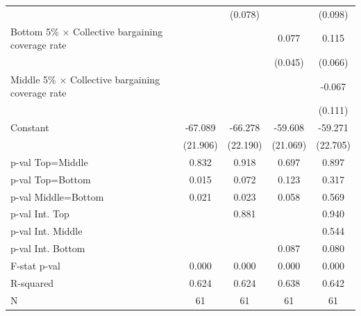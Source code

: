 \begin{tabular}{l*{4}{c}}
                    &            &     (0.078)&            &     (0.098)\\
\addlinespace
Bottom 5\% $\times$ Collective bargaining coverage rate&            &            &       0.077&       0.115\\
                    &            &            &     (0.045)&     (0.066)\\
\addlinespace
Middle 5\% $\times$ Collective bargaining coverage rate&            &            &            &      -0.067\\
                    &            &            &            &     (0.111)\\
\addlinespace
Constant            &     -67.089&     -66.278&     -59.608&     -59.271\\
                    &    (21.906)&    (22.190)&    (21.069)&    (22.705)\\
\midrule
p-val Top=Middle    &       0.832&       0.918&       0.697&       0.897\\
p-val Top=Bottom    &       0.015&       0.072&       0.123&       0.317\\
p-val Middle=Bottom &       0.021&       0.023&       0.058&       0.569\\
p-val Int. Top      &            &       0.881&            &       0.940\\
p-val Int. Middle   &            &            &            &       0.544\\
p-val Int. Bottom   &            &            &       0.087&       0.080\\
F-stat p-val        &       0.000&       0.000&       0.000&       0.000\\
R-squared           &       0.624&       0.624&       0.638&       0.642\\
N                   &          61&          61&          61&          61\\
\bottomrule
\end{tabular}
